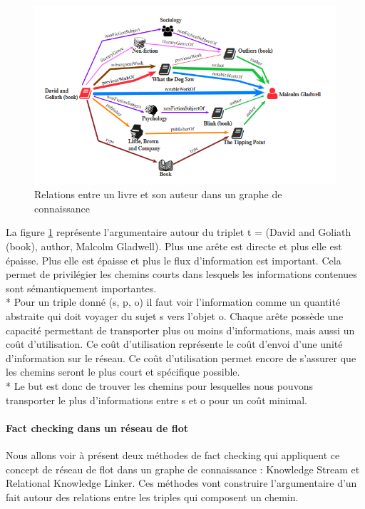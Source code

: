 \begin{figure}[H]
\centering
\includegraphics[width=\textwidth, draft=false]{imgs/bookAuthorKG.PNG}
\caption{Relations entre un livre et son auteur dans un graphe de connaissance \cite{shiralkar2017finding}}
\label{stream}
\end{figure}

La figure \ref{stream} représente l'argumentaire autour du triplet t = (David and Goliath (book), author, Malcolm Gladwell). Plus une arête est directe et plus elle est épaisse. Plus elle est épaisse et plus le flux d'information est important. Cela permet de privilégier les chemins courts dans lesquels les informations contenues sont sémantiquement importantes. 
\\*
Pour un triple donné (s, p, o) il faut voir l'information comme un quantité abstraite qui doit voyager du sujet s vers l'objet o. Chaque arête possède une capacité permettant de transporter plus ou moins d'informations, mais aussi un coût d'utilisation. Ce coût d'utilisation représente le coût d'envoi d'une unité d'information sur le réseau. Ce coût d'utilisation permet encore de s'assurer que les chemins seront le plus court et spécifique possible.
\\*
Le but est donc de trouver les chemins pour lesquelles nous pouvons transporter le plus d'informations entre s et o pour un coût minimal.

\paragraph{Fact checking dans un réseau de flot}

Nous allons voir à présent deux méthodes de fact checking qui appliquent ce concept de réseau de flot dans un graphe de connaissance : Knowledge Stream et Relational Knowledge Linker. Ces méthodes vont construire l'argumentaire d'un fait autour des relations entre les triples qui composent un chemin.

